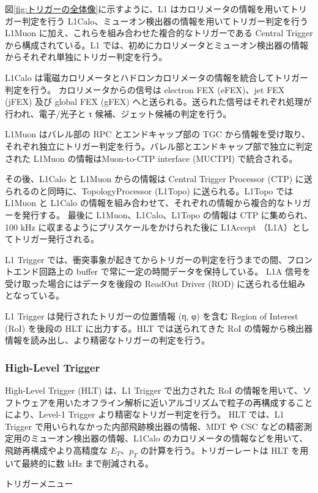 図\ref{fig:トリガーの全体像}に示すように、L1 はカロリメータの情報を用いてトリガー判定を行う L1Calo、ミューオン検出器の情報を用いてトリガー判定を行う L1Muon に加え、これらを組み合わせた複合的なトリガーである Central Trigger から構成されている。L1 では、初めにカロリメータとミューオン検出器の情報からそれぞれ単独にトリガー判定を行う。

L1Calo は電磁カロリメータとハドロンカロリメータの情報を統合してトリガー判定を行う。
カロリメータからの信号は electron FEX (eFEX)、jet FEX (jFEX) 及び global FEX (gFEX) へと送られる。送られた信号はそれぞれ処理が行われ、電子/光子と τ 候補、ジェット候補の判定を行う。

L1Muon はバレル部の RPC とエンドキャップ部の TGC から情報を受け取り、それぞれ独立にトリガー判定を行う。バレル部とエンドキャップ部で独立に判定された L1Muon の情報はMuon-to-CTP interface (MUCTPI) で統合される。

その後、L1Calo と L1Muon からの情報は Central Trigger Processor (CTP) に送られるのと同時に、TopologyProcessor (L1Topo) に送られる。L1Topo では L1Muon と L1Calo の情報を組み合わせて、それぞれの情報から複合的なトリガーを発行する。
最後に L1Muon、L1Calo、L1Topo の情報は CTP に集められ、100 kHz に収まるようにプリスケールをかけられた後に L1Accept （L1A）としてトリガー発行される。

L1 Trigger では、衝突事象が起きてからトリガーの判定を行うまでの間、フロントエンド回路上の buffer で常に一定の時間データを保持している。
L1A 信号を受け取った場合にはデータを後段の ReadOut Driver (ROD) に送られる仕組みとなっている。

L1 Trigger は発行されたトリガーの位置情報 (η, φ) を含む Region of Interest (RoI) を後段の HLT に出力する。HLT では送られてきた RoI の情報から検出器情報を読み出し、より精密なトリガーの判定を行う。

\subsubsection{High-Level Trigger}
High-Level Trigger (HLT) は、L1 Trigger で出力された RoI の情報を用いて、ソフトウェアを用いたオフライン解析に近いアルゴリズムで粒子の再構成することにより、Level-1 Trigger より精密なトリガー判定を行う。
HLT では、L1 Trigger で用いられなかった内部飛跡検出器の情報、MDT や CSC などの精密測定用のミューオン検出器の情報、L1Calo のカロリメータの情報などを用いて、飛跡再構成やより高精度な $E_T$、$p_T$ の計算を行う。トリガーレートは HLT を用いて最終的に数 kHz まで削減される。

トリガーメニュー


